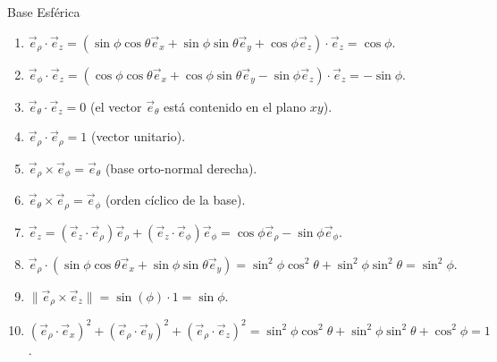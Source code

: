 \begin{solucion}{Base Esférica}
\begin{enumerate}
    \item $\vec{e}_\rho \cdot \vec{e}_z = (\sin\phi\cos\theta\vec{e}_x + \sin\phi\sin\theta\vec{e}_y + \cos\phi\vec{e}_z) \cdot \vec{e}_z = \cos\phi$.
    \item $\vec{e}_\phi \cdot \vec{e}_z = (\cos\phi\cos\theta\vec{e}_x + \cos\phi\sin\theta\vec{e}_y - \sin\phi\vec{e}_z) \cdot \vec{e}_z = -\sin\phi$.
    \item $\vec{e}_\theta \cdot \vec{e}_z = 0$ (el vector $\vec{e}_\theta$ está contenido en el plano $xy$).
    \item $\vec{e}_\rho \cdot \vec{e}_\rho = 1$ (vector unitario).
    \item $\vec{e}_\rho \times \vec{e}_\phi = \vec{e}_\theta$ (base orto-normal derecha).
    \item $\vec{e}_\theta \times \vec{e}_\rho = \vec{e}_\phi$ (orden cíclico de la base).
    \item $\vec{e}_z = (\vec{e}_z \cdot \vec{e}_\rho)\vec{e}_\rho + (\vec{e}_z \cdot \vec{e}_\phi)\vec{e}_\phi = \cos\phi\vec{e}_\rho - \sin\phi\vec{e}_\phi$.
    \item $\vec{e}_\rho \cdot (\sin\phi\cos\theta\vec{e}_x + \sin\phi\sin\theta\vec{e}_y) = \sin^2\phi\cos^2\theta + \sin^2\phi\sin^2\theta = \sin^2\phi$.
    \item $\| \vec{e}_\rho \times \vec{e}_z \| = \sin(\phi) \cdot 1 = \sin\phi$.
    \item $(\vec{e}_\rho \cdot \vec{e}_x)^2 + (\vec{e}_\rho \cdot \vec{e}_y)^2 + (\vec{e}_\rho \cdot \vec{e}_z)^2 = \sin^2\phi\cos^2\theta + \sin^2\phi\sin^2\theta + \cos^2\phi = 1$.
\end{enumerate}
\end{solucion}
